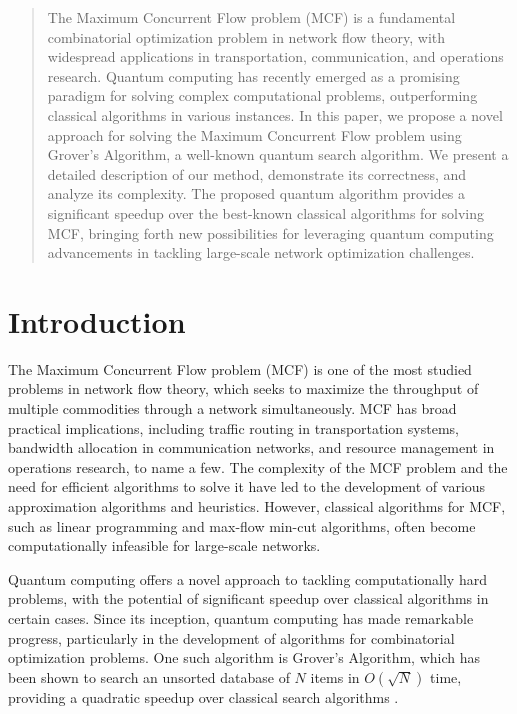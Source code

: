 \begin{abstract}
The Maximum Concurrent Flow problem (MCF) is a fundamental combinatorial optimization problem in network flow theory, with widespread applications in transportation, communication, and operations research. Quantum computing has recently emerged as a promising paradigm for solving complex computational problems, outperforming classical algorithms in various instances. In this paper, we propose a novel approach for solving the Maximum Concurrent Flow problem using Grover's Algorithm, a well-known quantum search algorithm. We present a detailed description of our method, demonstrate its correctness, and analyze its complexity. The proposed quantum algorithm provides a significant speedup over the best-known classical algorithms for solving MCF, bringing forth new possibilities for leveraging quantum computing advancements in tackling large-scale network optimization challenges.

\end{abstract}

\section{Introduction}

The Maximum Concurrent Flow problem (MCF) is one of the most studied problems in network flow theory, which seeks to maximize the throughput of multiple commodities through a network simultaneously. MCF has broad practical implications, including traffic routing in transportation systems, bandwidth allocation in communication networks, and resource management in operations research, to name a few. The complexity of the MCF problem and the need for efficient algorithms to solve it have led to the development of various approximation algorithms and heuristics. However, classical algorithms for MCF, such as linear programming and max-flow min-cut algorithms, often become computationally infeasible for large-scale networks.

Quantum computing offers a novel approach to tackling computationally hard problems, with the potential of significant speedup over classical algorithms in certain cases. Since its inception, quantum computing has made remarkable progress, particularly in the development of algorithms for combinatorial optimization problems. One such algorithm is Grover's Algorithm, which has been shown to search an unsorted database of $N$ items in $O(\sqrt{N})$ time, providing a quadratic speedup over classical search algorithms \cite{grover1996fast}.

